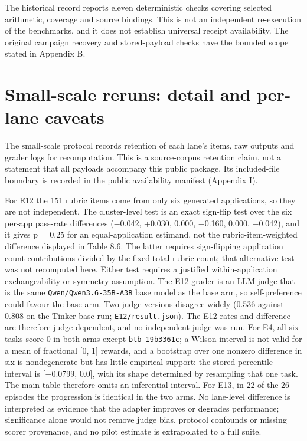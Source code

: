 \documentclass[12pt,a4paper]{report}
\begin{document}
The historical record reports eleven deterministic checks covering
selected arithmetic, coverage and source bindings. This is not an
independent re-execution of the benchmarks, and it does not establish
universal receipt availability. The original campaign recovery and
stored-payload checks have the bounded scope stated in Appendix B.

\section{Small-scale reruns: detail and per-lane
caveats}\label{small-scale-reruns-detail-and-per-lane-caveats}

The small-scale protocol records retention of each lane's items, raw
outputs and grader logs for recomputation. This is a source-corpus
retention claim, not a statement that all payloads accompany this public
package. Its included-file boundary is recorded in the public
availability manifest (Appendix I).

For E12 the 151 rubric items come from only six generated applications,
so they are not independent. The cluster-level test is an exact
sign-flip test over the six per-app pass-rate differences (−0.042,
+0.030, 0.000, −0.160, 0.000, −0.042), and it gives p = 0.25 for an
equal-application estimand, not the rubric-item-weighted difference
displayed in Table 8.6. The latter requires sign-flipping application
count contributions divided by the fixed total rubric count; that
alternative test was not recomputed here. Either test requires a
justified within-application exchangeability or symmetry assumption. The
E12 grader is an LLM judge that is the same
\texttt{Qwen/Qwen3.6-35B-A3B} base model as the base arm, so
self-preference could favour the base arm. Two judge versions disagree
widely (0.536 against 0.808 on the Tinker base run;
\texttt{E12/result.json}). The E12 rates and difference are therefore
judge-dependent, and no independent judge was run. For E4, all six tasks
score 0 in both arms except \texttt{btb-19b3361c}; a Wilson interval is
not valid for a mean of fractional {[}0, 1{]} rewards, and a bootstrap
over one nonzero difference in six is nondegenerate but has little
empirical support: the stored percentile interval is {[}−0.0799, 0.0{]},
with its shape determined by resampling that one task. The main table
therefore omits an inferential interval. For E13, in 22 of the 26
episodes the progression is identical in the two arms. No lane-level
difference is interpreted as evidence that the adapter improves or
degrades performance; significance alone would not remove judge bias,
protocol confounds or missing scorer provenance, and no pilot estimate
is extrapolated to a full suite.
\end{document}
